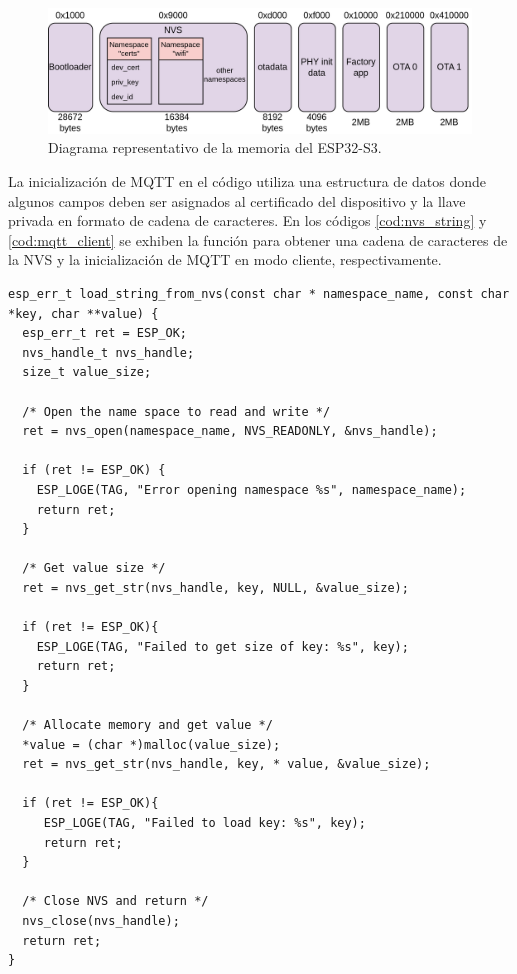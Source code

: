 \begin{figure}[h]
	\centering
	\includegraphics[scale=0.22]{./Figures/fw_parttab2.png}
	\caption{Diagrama representativo de la memoria del ESP32-S3.}
	\label{fig:fw_parttab2}
\end{figure}

La inicialización de MQTT en el código utiliza una estructura de datos donde algunos campos deben ser asignados al certificado del dispositivo y la llave privada en formato de cadena de caracteres. En los códigos \ref{cod:nvs_string} y \ref{cod:mqtt_client} se exhiben la función para obtener una cadena de caracteres de la NVS y la inicialización de MQTT en modo cliente, respectivamente.

\begin{lstlisting}[label=cod:nvs_string,caption=Función para cargar una cadena de caracteres de la NVS.]
esp_err_t load_string_from_nvs(const char * namespace_name, const char *key, char **value) {
  esp_err_t ret = ESP_OK;
  nvs_handle_t nvs_handle;
  size_t value_size;

  /* Open the name space to read and write */
  ret = nvs_open(namespace_name, NVS_READONLY, &nvs_handle);

  if (ret != ESP_OK) {
	ESP_LOGE(TAG, "Error opening namespace %s", namespace_name);
	return ret;
  }

  /* Get value size */
  ret = nvs_get_str(nvs_handle, key, NULL, &value_size);

  if (ret != ESP_OK){
	ESP_LOGE(TAG, "Failed to get size of key: %s", key);
    return ret;
  }

  /* Allocate memory and get value */
  *value = (char *)malloc(value_size);
  ret = nvs_get_str(nvs_handle, key, * value, &value_size);

  if (ret != ESP_OK){
	 ESP_LOGE(TAG, "Failed to load key: %s", key);
     return ret;
  }

  /* Close NVS and return */
  nvs_close(nvs_handle);
  return ret;
}
\end{lstlisting}

